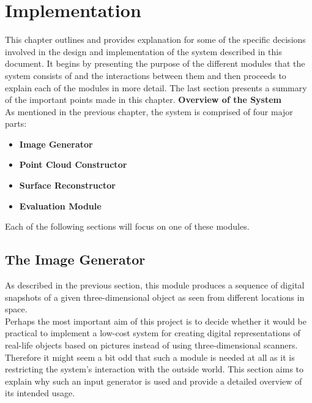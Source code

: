 \documentclass[12pt,a4paper,twoside,openright]{report}
\begin{document}
\chapter{Implementation}
This chapter outlines and provides explanation for some of the specific decisions involved in the design and implementation of the system described in this document. It begins by presenting the purpose of the different modules that the system consists of and the interactions between them and then proceeds to explain each of the modules in more detail. The last section presents a summary of the important points made in this chapter.
\linebreak
\linebreak
\linebreak
{\Large\textbf{Overview of the System}} \\
\linebreak
As mentioned in the previous chapter, the system is comprised of four major parts:
\begin{itemize}
\item \textbf{Image Generator}
\item \textbf{Point Cloud Constructor} 
\item \textbf{Surface Reconstructor}
\item \textbf{Evaluation Module}
\end{itemize}
Each of the following sections will focus on one of these modules. 

\section{The Image Generator}
As described in the previous section, this module produces a sequence of digital snapshots of a given three-dimensional object as seen from different locations in space. \\
Perhaps the most important aim of this project is to decide whether it would be practical to implement a low-cost system for creating digital representations of real-life objects based on pictures instead of using three-dimensional scanners. Therefore it might seem a bit odd that such a module is needed at all as it is restricting the system's interaction with the outside world. This section aims to explain why such an input generator is used and provide a detailed overview of its intended usage. 
\end{document}
